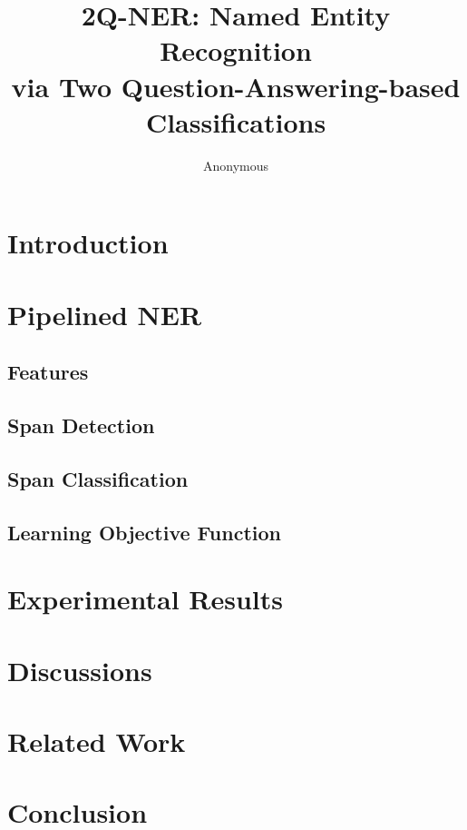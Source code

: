 \documentclass[letterpaper]{article} %
\title{2Q-NER: Named Entity Recognition \\ via Two Question-Answering-based Classifications}
\author {
    Anonymous
}
\begin{document}
\maketitle
\begin{abstract}

\end{abstract}

\section{Introduction}
\label{sec:intro}


\section{Pipelined NER}
\label{sec:method}


\subsection{Features}
\label{sec:features}


\subsection{Span Detection}
\label{sec:span}


\subsection{Span Classification}
\label{sec:class}


\subsection{Learning Objective Function}
\label{sec:loss}


\section{Experimental Results}
\label{sec:exp}


\section{Discussions}
\label{sec:discussion}


\section{Related Work}
\label{sec:related}


\section{Conclusion}





%


\end{document}
